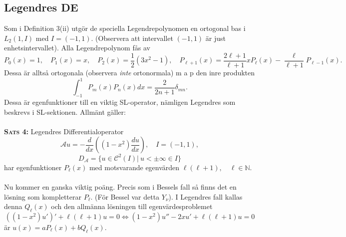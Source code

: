 \documentclass{article}
\begin{document}
\subsection{Legendres DE}
Som i Definition 3(ii) utgör de speciella Legendrepolynomen en ortogonal bas i $L_2(1,I)$ med $I=(-1,1)$. (Observera att intervallet $(-1,1)$ är just enhetsintervallet). Alla Legendrepolynom fås av 
$$
P_0(x)=1, \quad P_1(x)=x, \quad P_2(x)=\frac{1}{2}(3x^2-1), \quad P_{\ell+1}(x) = \frac{2\ell + 1}{\ell+1} x P_\ell(x) - \frac{\ell}{\ell+1} P_{\ell-1}(x).
$$
Dessa är alltså ortogonala (observera \textit{inte} ortonormala) m a p den inre produkten
$$
\int_{-1}^1P_m(x)P_n(x)dx=\frac{2}{2n+1}\delta_{mn}.
$$
Dessa är egenfunktioner till en viktig SL-operator, nämligen Legendres som beskrevs i SL-sektionen. Allmänt gäller:\\ \\
\textbf{\textsc{Sats 4:}} Legendres Differentialoperator
$$\mathcal{A}u=-\frac{d}{dx}((1-x^2)\frac{du}{dx}), \quad I=(-1,1),
$$
$$
D_{\mathcal{A}}=\{u\in\mathcal{C}^2(I)| \ u<\pm\infty\in I\}
$$
har egenfunktioner $P_{\ell}(x)$ med motsvarande egenvärden $\ell(\ell+1), \quad \ell\in\mathbb{N}$.\\ \\

Nu kommer en ganska viktig poäng. Precis som i Bessels fall så finns det en lösning som kompletterar $P_{\ell}$. (För Bessel var detta $Y_{\nu}$). I Legendres fall kallas denna $Q_{\ell}(x)$ och den allmänna lösningen till egenvärdesproblemet 
\begin{equation}\label{eq:legdiff}
    ((1-x^2)u')'+\ell(\ell+1)u=0 \Longleftrightarrow (1-x^2)u''-2xu'+\ell(\ell+1)u=0
\end{equation}
är $u(x)=aP_{\ell}(x)+bQ_{\ell}(x)$.\\ 
\end{document}
